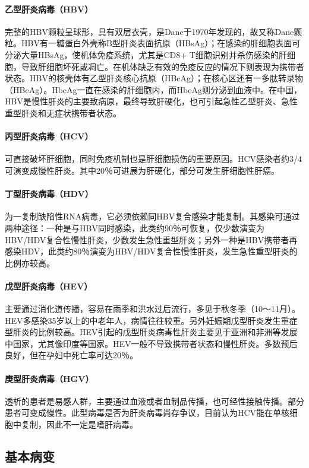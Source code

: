 \paragraph{乙型肝炎病毒（HBV）}
完整的HBV颗粒呈球形，具有双层衣壳，是Dane于1970年发现的，故又称Dane颗粒。HBV有一糖蛋白外壳称B型肝炎表面抗原（HBsAg）；在感染的肝细胞表面可分泌大量HBsAg，使机体免疫系统，尤其是CD8{+}
T细胞识别并杀伤感染的肝细胞，导致肝细胞坏死或凋亡。在机体缺乏有效的免疫反应的情况下则表现为携带者状态。HBV的核壳体有乙型肝炎核心抗原（HBcAg）；在核心区还有一多肽转录物（HBeAg）。HbcAg一直在感染的肝细胞内，而HbeAg则分泌到血液中。在中国，HBV是慢性肝炎的主要致病原，最终导致肝硬化，也可引起急性乙型肝炎、急性重型肝炎和无症状携带者状态。

\paragraph{丙型肝炎病毒（HCV）}
可直接破坏肝细胞，同时免疫机制也是肝细胞损伤的重要原因。HCV感染者约3/4可演变成慢性肝炎。其中20％可进展为肝硬化，部分可发生肝细胞性肝癌。

\paragraph{丁型肝炎病毒（HDV）}
为一复制缺陷性RNA病毒，它必须依赖同HBV复合感染才能复制。其感染可通过两种途径：一种是与HBV同时感染，此类约90％可恢复，仅少数演变为HBV/HDV复合性慢性肝炎，少数发生急性重型肝炎；另外一种是HBV携带者再感染HDV，此类约80％演变为HBV/HDV复合性慢性肝炎，发生急性重型肝炎的比例亦较高。

\paragraph{戊型肝炎病毒（HEV）}
主要通过消化道传播，容易在雨季和洪水过后流行，多见于秋冬季（10～11月）。HEV多感染35岁以上的中老年人，病情往往较重。另外妊娠期戊型肝炎发生重症型肝炎的比例较高。HEV引起的戊型肝炎病毒性肝炎主要见于亚洲和非洲等发展中国家，尤其像印度等国家。HEV一般不导致携带者状态和慢性肝炎。多数预后良好，但在孕妇中死亡率可达20％。

\paragraph{庚型肝炎病毒（HGV）}
透析的患者是易感人群，主要通过血液或者血制品传播，也可经性接触传播。部分患者可变成慢性。此型病毒是否为肝炎病毒尚存争议，目前认为HCV能在单核细胞中复制，因此不一定是嗜肝病毒。

\subsection{基本病变}

